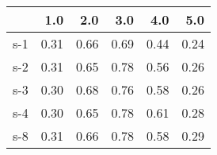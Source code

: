 \begin{tabular}{lrrrrr}
\toprule
{} &  1.0 &  2.0 &  3.0 &  4.0 &  5.0 \\
\midrule
s-1 & 0.31 & 0.66 & 0.69 & 0.44 & 0.24 \\
s-2 & 0.31 & 0.65 & 0.78 & 0.56 & 0.26 \\
s-3 & 0.30 & 0.68 & 0.76 & 0.58 & 0.26 \\
s-4 & 0.30 & 0.65 & 0.78 & 0.61 & 0.28 \\
s-8 & 0.31 & 0.66 & 0.78 & 0.58 & 0.29 \\
\bottomrule
\end{tabular}
